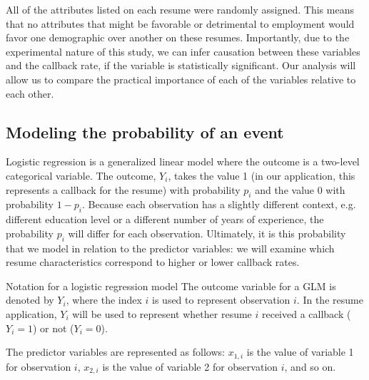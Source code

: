 All of the attributes listed on each resume were
randomly assigned.
This means that no attributes that might be favorable
or detrimental to employment would favor one demographic
over another on these resumes.
Importantly, due to the experimental nature of this study,
we can infer causation between these variables and the
callback rate, if the variable is statistically significant.
Our analysis will allow us to compare the practical
importance of each of the variables relative to each other.




\subsection{Modeling the probability of an event}
\label{modelingTheProbabilityOfAnEvent}

Logistic regression is a generalized linear model where
the outcome is a two-level categorical variable.
The outcome, $Y_i$, takes the value 1
(in our application, this represents a callback
for the resume)
with probability $p_i$
and the value 0 with probability $1 - p_i$.
Because each observation has a slightly different
context, e.g. different education level or a different
number of years of experience, the probability $p_i$
will differ for each observation.
Ultimately, it is this probability that we model
in relation to the predictor variables:
we will examine which resume characteristics
correspond to higher or lower callback rates.

\begin{onebox}{Notation for a logistic regression model}
The outcome variable for a GLM is denoted by $Y_i$,
where the index $i$ is used to represent observation $i$.
In the resume application, $Y_i$ will be used to represent
whether resume $i$ received a callback ($Y_i=1$)
or not ($Y_i=0$). \vspace{3mm}

The predictor variables are represented as follows:
$x_{1,i}$ is the value of variable 1 for observation $i$,
$x_{2,i}$ is the value of variable 2 for observation $i$,
and so on.
\end{onebox}

